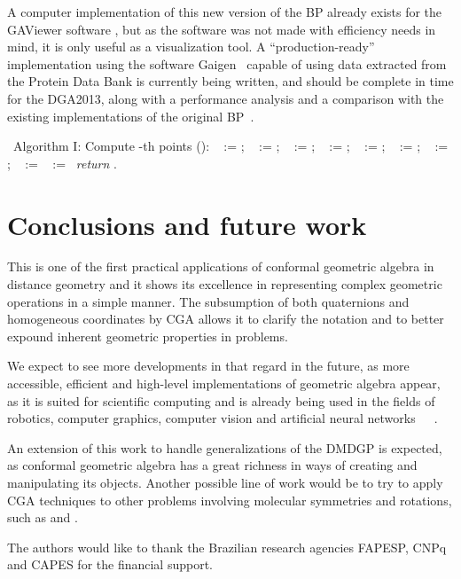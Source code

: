 \documentclass{proc}
\begin{document}
A computer implementation of this new version of the BP already exists for the GAViewer software \cite{Dorst2007}, but as the software was not made with efficiency needs in mind, it is only useful as a visualization tool.
A ``production-ready'' implementation using the software Gaigen~\cite{gaigen} capable of using data extracted from the Protein Data Bank is currently being written, and should be complete in time for the DGA2013, along with a performance analysis and a comparison with the existing implementations of the original BP~\cite{itor2008}.


\begin{algorithm}
\
{\bit Algorithm I: Compute -th points} ():
\ {\bf } := ;
\ {\bf } := ; 
\ {\bf } := ;
\ {\bf } := ;
\ {\bf } := ; 
\ {\bf } := ; 
\ {\bf } := ; 
\ {\bf } :=  \note{/* Apply it  */}
\ {\bf } :=  
\ {\it return} .
\end{algorithm}

\section{Conclusions and future work}
This is one of the first practical applications of conformal geometric algebra in distance geometry and it shows its excellence in representing complex geometric operations in a simple manner. The subsumption of both quaternions and homogeneous coordinates by CGA allows it to clarify the notation and to better expound inherent geometric properties in problems.

We expect to see more developments in that regard in the future, as more accessible, efficient and high-level implementations of geometric algebra appear, as it is suited for scientific computing and is already being used in the fields of robotics, computer graphics, computer vision and artificial neural networks~\cite{Corrochano2010}~\cite{Dorst2007}~\cite{Perwass}.

An extension of this work to handle generalizations of the DMDGP is expected, as conformal geometric algebra has a great richness in ways of creating and manipulating its objects.
Another possible line of work would be to try to apply CGA techniques to other problems involving molecular symmetries and rotations, such as \cite{Fritzer2001} and \cite{Karney2007}.



\begin{acknowledgments}
The authors would like to thank the Brazilian research agencies FAPESP, CNPq and CAPES for the financial support.
\end{acknowledgments}


  
\end{document}
